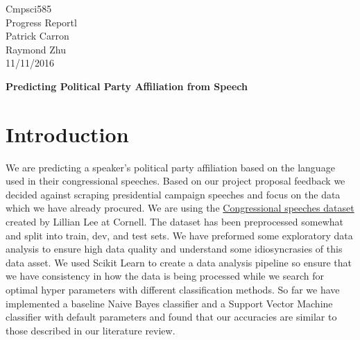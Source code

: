 \documentclass[a4paper, 11pt]{article}
\begin{document}
\noindent
Cmpsci585\\
Progress Reportl\\
Patrick Carron \\
Raymond Zhu\\
11/11/2016 \\
\begin{center}

\textbf{Predicting Political Party Affiliation from Speech}
\end{center}
\section{Introduction}
We are predicting a speaker's political party affiliation based on the language used in their congressional speeches. Based on our project proposal feedback we decided against scraping presidential campaign speeches and focus on the data which we have already procured. We are using the \href{http://www.cs.cornell.edu/home/llee/data/convote.html}{Congressional speeches dataset} created by Lillian Lee at Cornell. The dataset has been preprocessed somewhat and split into train, dev, and test sets.  We have preformed some exploratory data analysis to ensure high data quality and understand some idiosyncrasies of this data asset. We used Scikit Learn to create a data analysis pipeline so ensure that we have consistency in how the data is being processed while we search for optimal hyper parameters with different classification methods. So far we have implemented a baseline Naive Bayes classifier and a Support Vector Machine classifier with default parameters and found that our accuracies are similar to those described in our literature review.
\end{document}
